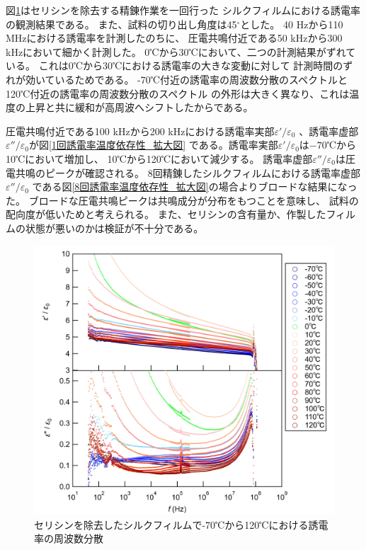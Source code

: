 \documentclass[dvipdfmx,12pt,a4paper]{jreport}
\begin{document}
			\newpage
			図\ref{温度_誘電率_セリシンなし_全体像}はセリシンを除去する精錬作業を一回行った
			シルクフィルムにおける誘電率の観測結果である。
			また、試料の切り出し角度は45$^{\circ}$とした。
			40 Hzから110 MHzにおける誘電率を計測したのちに、
			圧電共鳴付近である50 kHzから300 kHzにおいて細かく計測した。
			0℃から30℃において、二つの計測結果がずれている。
			これは0℃から30℃における誘電率の大きな変動に対して
			計測時間のずれが効いているためである。
			-70℃付近の誘電率の周波数分散のスペクトルと120℃付近の誘電率の周波数分散のスペクトル
			の外形は大きく異なり、これは温度の上昇と共に緩和が高周波へシフトしたからである。

			圧電共鳴付近である100 kHzから200 kHzにおける誘電率実部$\varepsilon'/\varepsilon_0$
			、誘電率虚部$\varepsilon''/\varepsilon_0$が図\ref{1回誘電率温度依存性_拡大図}
			である。誘電率実部$\varepsilon'/\varepsilon_0$は$-70$℃から10℃において増加し、
			10℃から120℃において減少する。
			誘電率虚部$\varepsilon''/\varepsilon_0$は圧電共鳴のピークが確認される。
			8回精錬したシルクフィルムにおける誘電率虚部$\varepsilon''/\varepsilon_0$
			である図\ref{8回誘電率温度依存性_拡大図}の場合よりブロードな結果になった。
			ブロードな圧電共鳴ピークは共鳴成分が分布をもつことを意味し、
			試料の配向度が低いためと考えられる。
			また、セリシンの含有量か、作製したフィルムの状態が悪いのかは検証が不十分である。
			\begin{figure}[H]
				\centering
				\includegraphics[width=\linewidth]{温度_誘電率_セリシンなし.jpg}
				\caption{セリシンを除去したシルクフィルムで-70℃から120℃における誘電率の周波数分散}
				\label{温度_誘電率_セリシンなし_全体像}
			\end{figure}
\end{document}
